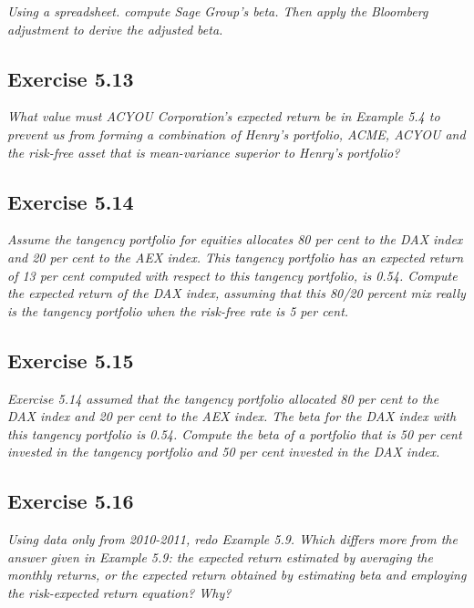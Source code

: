 \documentclass[]{book}
\theoremstyle{definition}
\theoremstyle{definition}
\theoremstyle{remark}
\begin{document}
\emph{Using a spreadsheet. compute Sage Group's beta. Then apply the
Bloomberg adjustment to derive the adjusted beta.} \citep[p.161]{book}

\subsection{Exercise 5.13}\label{exercise-5.13}

\emph{What value must ACYOU Corporation's expected return be in Example
5.4 to prevent us from forming a combination of Henry's portfolio, ACME,
ACYOU and the risk-free asset that is mean-variance superior to Henry's
portfolio?} \citep[p.162]{book}

\subsection{Exercise 5.14}\label{exercise-5.14}

\emph{Assume the tangency portfolio for equities allocates 80 per cent
to the DAX index and 20 per cent to the AEX index. This tangency
portfolio has an expected return of 13 per cent computed with respect to
this tangency portfolio, is 0.54. Compute the expected return of the DAX
index, assuming that this 80/20 percent mix really is the tangency
portfolio when the risk-free rate is 5 per cent.} \citep[p.162]{book}

\subsection{Exercise 5.15}\label{exercise-5.15}

\emph{Exercise 5.14 assumed that the tangency portfolio allocated 80 per
cent to the DAX index and 20 per cent to the AEX index. The beta for the
DAX index with this tangency portfolio is 0.54. Compute the beta of a
portfolio that is 50 per cent invested in the tangency portfolio and 50
per cent invested in the DAX index.} \citep[p.162]{book}

\subsection{Exercise 5.16}\label{exercise-5.16}

\emph{Using data only from 2010-2011, redo Example 5.9. Which differs
more from the answer given in Example 5.9: the expected return estimated
by averaging the monthly returns, or the expected return obtained by
estimating beta and employing the risk-expected return equation? Why?}
\citep[p.162]{book}
\end{document}
